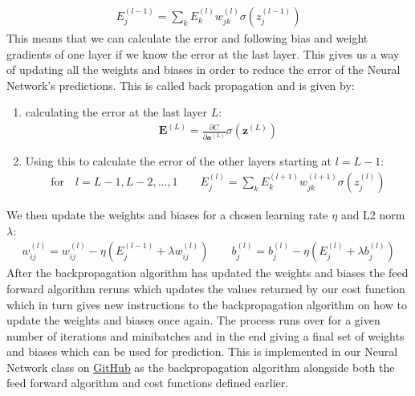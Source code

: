 \documentclass[11pt]{article}
\begin{document}
\begin{align*}
    E^{(l-1)}_j = \sum_k E^{(l)}_k w_{jk}^{(l)}\sigma(z_j^{(l-1)})
\end{align*}
This means that we can calculate the error and following bias and weight gradients of one layer if we know the error at the last layer. This gives us a way of updating all the weights and biases in order to reduce the error of the Neural Network's predictions. This is called back propagation and is given by:
\begin{enumerate}
    \item calculating the error at the last layer $L$:
          \begin{align*}
              \boldsymbol{E}^{(L)} = \frac{\partial C }{\partial \boldsymbol{a}^{(L)}} \sigma(\boldsymbol{z}^{(L)})
          \end{align*}
    \item Using this to calculate the error of the other layers starting at $l=L-1$:
          \begin{align*}
              \text{for}\quad  l=L-1, L-2,...,1 \quad\quad
              E_j^{(l)} = \sum_k E^{(l+1)}_k w_{jk}^{(l+1)} \sigma(z_j^{(l)})
          \end{align*}
\end{enumerate}
We then update the weights and biases for a chosen learning rate $\eta$ and L2 norm $\lambda$:
\begin{align*}
    w^{(l)}_{ij} = w^{(l)}_{ij} - \eta(E_j^{(l-1)}  + \lambda w_{ij}^{(l)}) \quad\quad b_j^{(l)} = b_j^{(l)} - \eta(E_j^{(l)} + \lambda b_j^{(l)})
\end{align*}
After the backpropagation algorithm has updated the weights and biases the feed forward algorithm reruns which updates the values returned by our cost function which in turn gives new instructions to the backpropagation algorithm on how to update the weights and biases once again. The process runs over for a given number of iterations and minibatches and in the end giving a final set of weights and biases which can be used for prediction. This is implemented in our Neural Network class on \href{https://github.com/Fslippe/FYS-STK4155/tree/main/project2}{GitHub} as the backpropagation algorithm alongside both the feed forward algorithm and cost functions defined earlier.
\end{document}
